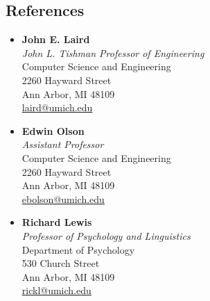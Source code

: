\documentclass[margin,line,11pt]{res}
\begin{document}
\begin{resume}
\section{\sc References}
\vspace{-0.02cm}
\begin{multicols}{2}
\begin{itemize}
\item \textbf{John E. Laird} \\
  \emph{John L. Tishman Professor of Engineering} \\
  Computer Science and Engineering \\ 
  2260 Hayward Street\\
  Ann Arbor, MI 48109\\
  \href{mailto:laird@umich.edu}{laird@umich.edu}
\item \textbf{Edwin Olson} \\
  \emph{Assistant Professor} \\
  Computer Science and Engineering \\ 
  2260 Hayward Street\\
  Ann Arbor, MI 48109\\
  \href{mailto:ebolson@umich.edu}{ebolson@umich.edu}
\item \textbf{Richard Lewis} \\
  \emph{Professor of Psychology and Linguistics} \\
  Department of Psychology \\ 
  530 Church Street\\
  Ann Arbor, MI 48109\\
  \href{mailto:rickl@umich.edu}{rickl@umich.edu}\\
\\
\\
\\
\\
\end{itemize}
\end{multicols}
\end{resume}
\end{document}
